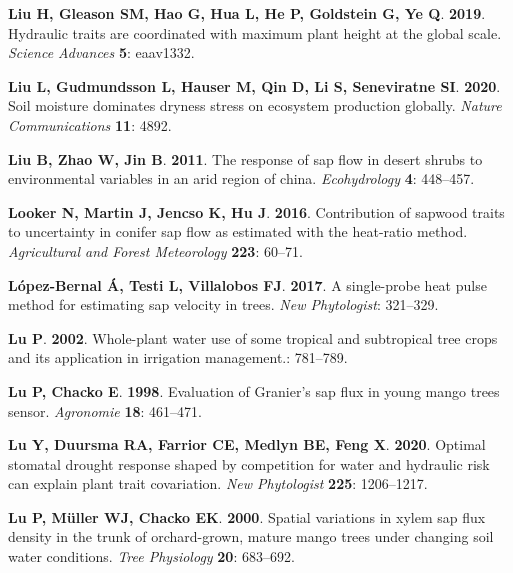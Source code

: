 \documentclass[11pt,twoside]{reedthesis}
\begin{document}
\hypertarget{ref-liu_hydraulic_2019}{}
\textbf{\textnormal{Liu H}, \textnormal{Gleason SM}, \textnormal{Hao G},
\textnormal{Hua L}, \textnormal{He P}, \textnormal{Goldstein G},
\textnormal{Ye Q}}. \textbf{2019}. Hydraulic traits are coordinated with
maximum plant height at the global scale. \emph{Science Advances}
\textbf{5}: eaav1332.

\hypertarget{ref-liu_soil_2020}{}
\textbf{\textnormal{Liu L}, \textnormal{Gudmundsson L},
\textnormal{Hauser M}, \textnormal{Qin D}, \textnormal{Li S},
\textnormal{Seneviratne SI}}. \textbf{2020}. Soil moisture dominates
dryness stress on ecosystem production globally. \emph{Nature
Communications} \textbf{11}: 4892.

\hypertarget{ref-Liu2011}{}
\textbf{\textnormal{Liu B}, \textnormal{Zhao W}, \textnormal{Jin B}}.
\textbf{2011}. The response of sap flow in desert shrubs to
environmental variables in an arid region of china. \emph{Ecohydrology}
\textbf{4}: 448--457.

\hypertarget{ref-Looker2016}{}
\textbf{\textnormal{Looker N}, \textnormal{Martin J}, \textnormal{Jencso
K}, \textnormal{Hu J}}. \textbf{2016}. Contribution of sapwood traits to
uncertainty in conifer sap flow as estimated with the heat-ratio method.
\emph{Agricultural and Forest Meteorology} \textbf{223}: 60--71.

\hypertarget{ref-Lopez-Bernal2017}{}
\textbf{\textnormal{López-Bernal Á}, \textnormal{Testi L},
\textnormal{Villalobos FJ}}. \textbf{2017}. A single-probe heat pulse
method for estimating sap velocity in trees. \emph{New Phytologist}:
321--329.

\hypertarget{ref-Lu2002}{}
\textbf{\textnormal{Lu P}}. \textbf{2002}. Whole-plant water use of some
tropical and subtropical tree crops and its application in irrigation
management.: 781--789.

\hypertarget{ref-Lu1998}{}
\textbf{\textnormal{Lu P}, \textnormal{Chacko E}}. \textbf{1998}.
Evaluation of Granier's sap flux in young mango trees sensor.
\emph{Agronomie} \textbf{18}: 461--471.

\hypertarget{ref-lu_optimal_2020}{}
\textbf{\textnormal{Lu Y}, \textnormal{Duursma RA}, \textnormal{Farrior
CE}, \textnormal{Medlyn BE}, \textnormal{Feng X}}. \textbf{2020}.
Optimal stomatal drought response shaped by competition for water and
hydraulic risk can explain plant trait covariation. \emph{New
Phytologist} \textbf{225}: 1206--1217.

\hypertarget{ref-Lu2000}{}
\textbf{\textnormal{Lu P}, \textnormal{Müller WJ}, \textnormal{Chacko
EK}}. \textbf{2000}. Spatial variations in xylem sap flux density in the
trunk of orchard-grown, mature mango trees under changing soil water
conditions. \emph{Tree Physiology} \textbf{20}: 683--692.
\end{document}
